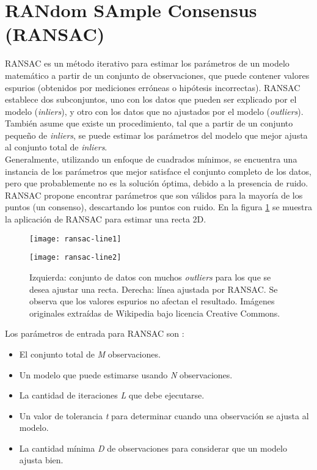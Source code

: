 \section{RANdom SAmple Consensus (RANSAC)}
\label{sec:ransac}
RANSAC \cite{Fischler81} es un método iterativo para estimar los parámetros de un modelo matemático a partir de un conjunto de observaciones, que puede contener valores espurios (obtenidos por mediciones erróneas o hipótesis incorrectas). RANSAC establece dos subconjuntos, uno con los datos que pueden ser explicado por el modelo (\textit{inliers}), y otro con los datos que no ajustados por el modelo (\textit{outliers}). También asume que existe un procedimiento, tal que a partir de un conjunto pequeño de \textit{inliers}, se puede estimar los parámetros del modelo que mejor ajusta al conjunto total de \textit{inliers}. \\
Generalmente, utilizando un enfoque de cuadrados mínimos, se encuentra una instancia de los parámetros que mejor satisface el conjunto completo de los datos, pero que probablemente no es la solución óptima, debido a la presencia de ruido. RANSAC propone encontrar parámetros que son válidos para la mayoría de los puntos (un consenso), descartando los puntos con ruido. En la figura \ref{fig:ransac-line2d} se muestra la aplicación de RANSAC para estimar una recta 2D.

\begin{figure}[ht]
\centering
\begin{minipage}[h]{.45\textwidth}
\begin{center}
\texttt{[image: ransac-line1]}
\end{center}
\end{minipage}
\hfill
\begin{minipage}[h]{.45\textwidth}
\begin{center}
\texttt{[image: ransac-line2]}
\end{center}
\end{minipage}
\hfill
\caption[RANSAC para estimar una recta 2D]
{Izquierda: conjunto de datos con muchos \textit{outliers} para los que se desea ajustar una recta. Derecha: línea ajustada por RANSAC. Se observa que los valores espurios no afectan el resultado. Imágenes originales extraídas de Wikipedia bajo licencia Creative Commons.}
\label{fig:ransac-line2d}
\end{figure}

Los parámetros de entrada para RANSAC son :
\begin{itemize}

\item El conjunto total de \textsl{M} observaciones.
\item Un modelo que puede estimarse usando \textsl{N} observaciones.
\item La cantidad de iteraciones \textsl{L} que debe ejecutarse.
\item Un valor de tolerancia \textsl{t} para determinar cuando una observación se ajusta al modelo.
\item La cantidad mínima \textsl{D} de observaciones para considerar que un modelo ajusta bien.

\end{itemize}

